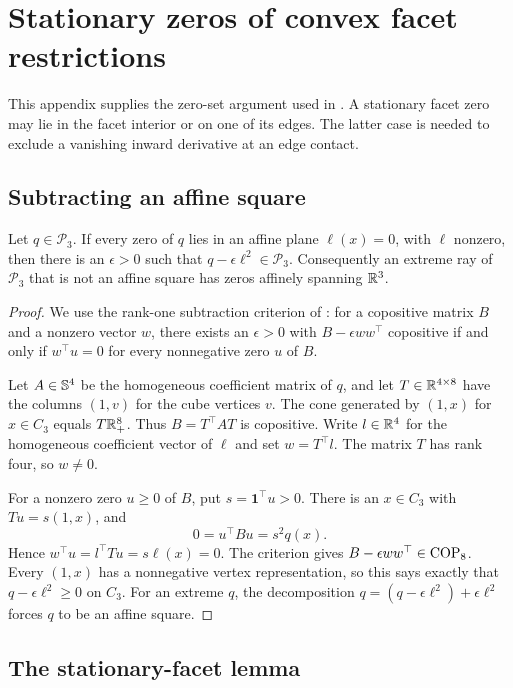\section{Stationary zeros of convex facet restrictions}
\label{app:three:facet-classification}

This appendix supplies the zero-set argument used in
. A stationary facet zero may lie in the
facet interior or on one of its edges. The latter case is needed to
exclude a vanishing inward derivative at an edge contact.

\subsection{Subtracting an affine square}

\begin{lemma}\label{three:zero-span}
Let $q\in\mathcal P_3$. If every zero of $q$ lies in an affine plane
$\ell(x)=0$, with $\ell$ nonzero, then there is an $\epsilon>0$ such that
$q-\epsilon\ell^2\in\mathcal P_3$. Consequently an extreme ray of
$\mathcal P_3$ that is not an affine square has zeros affinely spanning
$\mathbb R^3$.
\end{lemma}
\begin{proof}
We use the rank-one subtraction criterion of
\citet[Lemma~4.3 in arXiv version~4]{Hildebrand2014MinimalZeros}:
for a copositive matrix $B$
and a nonzero vector $w$, there exists an $\epsilon>0$ with
$B-\epsilon ww^\top$ copositive if and only if $w^\top u=0$ for every
nonnegative zero $u$ of $B$.

Let $A\in\mathbb S^4$ be the homogeneous coefficient matrix of $q$, and let
$T\in\mathbb R^{4\times8}$ have the columns $(1,v)$ for the cube vertices $v$.
The cone generated by $(1,x)$ for $x\in C_3$ equals $T\mathbb R_+^8$. Thus
$B=T^\top AT$ is copositive. Write $l\in\mathbb R^4$ for the homogeneous
coefficient vector of $\ell$ and set $w=T^\top l$. The matrix $T$ has
rank four, so $w\ne0$.

For a nonzero zero $u\ge0$ of $B$, put $s=\mathbf1^\top u>0$. There is
an $x\in C_3$ with $Tu=s(1,x)$, and
\[
 0=u^\top Bu=s^2q(x).
\]
Hence $w^\top u=l^\top Tu=s\ell(x)=0$. The criterion gives
$B-\epsilon ww^\top\in\operatorname{COP}_8$. Every $(1,x)$ has a nonnegative vertex
representation, so this says exactly that $q-\epsilon\ell^2\ge0$ on
$C_3$. For an extreme $q$, the decomposition
$q=(q-\epsilon\ell^2)+\epsilon\ell^2$ forces $q$ to be an affine square.
\end{proof}

\subsection{The stationary-facet lemma}

